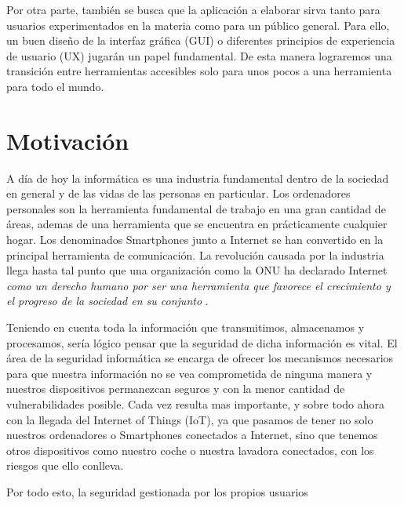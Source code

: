Por otra parte, también se busca que la aplicación a elaborar sirva tanto para usuarios experimentados en la materia como para un público general. Para ello, un buen diseño de la interfaz gráfica (GUI) o diferentes principios de experiencia de usuario (UX) jugarán un papel fundamental. De esta manera lograremos una transición entre herramientas accesibles solo para unos pocos a una herramienta para todo el mundo.

\section{Motivación}

A día de hoy la informática es una industria fundamental dentro de la sociedad en general y de las vidas de las personas en particular. Los ordenadores personales son la herramienta fundamental de trabajo en una gran cantidad de áreas, ademas de una herramienta que se encuentra en prácticamente cualquier hogar. Los denominados Smartphones junto a Internet se han convertido en la principal herramienta de comunicación. La revolución causada por la industria llega hasta tal punto que una organización como la ONU ha declarado Internet \textit{como un derecho humano por ser una herramienta que favorece el crecimiento y el progreso de la sociedad en su conjunto} \cite{onu-internet}.

Teniendo en cuenta toda la información que transmitimos, almacenamos y procesamos, sería lógico pensar que la seguridad de dicha información es vital. El área de la seguridad informática se encarga de ofrecer los mecanismos necesarios para que nuestra información no se vea comprometida de ninguna manera y nuestros dispositivos permanezcan seguros y con la menor cantidad de vulnerabilidades posible. Cada vez resulta mas importante, y sobre todo ahora con la llegada del Internet of Things (IoT), ya que pasamos de tener no solo nuestros ordenadores o Smartphones conectados a Internet, sino que tenemos otros dispositivos como nuestro coche o nuestra lavadora conectados, con los riesgos que ello conlleva.

{\color{red} Por todo esto, la seguridad gestionada por los propios usuarios }